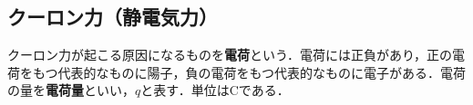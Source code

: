 











\subsection{クーロン力（静電気力）}

クーロン力が起こる原因になるものを\textbf{電荷}という．電荷には正負があり，正の電荷をもつ代表的なものに陽子，負の電荷をもつ代表的なものに電子がある．電荷の量を\textbf{電荷量}といい，$q$と表す．単位は$\mathrm{C}$である．

